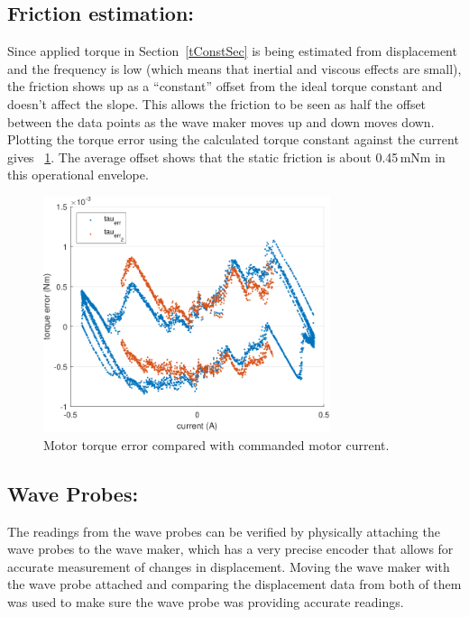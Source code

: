 \documentclass[hardware,article,submit,pdftex,moreauthors]{Definitions/mdpi}
\begin{document}
\subsection{Friction estimation:}\label{friction}
Since applied torque in Section~\ref{tConstSec} is being estimated from displacement and the frequency is low (which means that inertial and viscous effects are small), the friction shows up as a ``constant'' offset from the ideal torque constant and doesn't affect the slope.
This allows the friction to be seen as half the offset between the data points as the wave maker moves up and down moves down. 
Plotting the torque error using the calculated torque constant against the current gives \figurename~\ref{fig:TorqueError}.
The average offset shows that the static friction is about 0.45\,mNm in this operational envelope.

\begin{figure}[tb]
  \centering
  \includegraphics[width=0.75\textwidth]{diagrams/TorqueError.pdf}
  \caption{Motor torque error compared with commanded motor current.}
  \label{fig:TorqueError}
\end{figure}

\subsection{Wave Probes:}	\label{waveprobes}
The readings from the wave probes can be verified by physically attaching the wave probes to the wave maker, which has a very precise encoder that allows for accurate measurement of changes in displacement.
Moving the wave maker with the wave probe attached and comparing the displacement data from both of them was used to make sure the wave probe was providing accurate readings.
\end{document}
